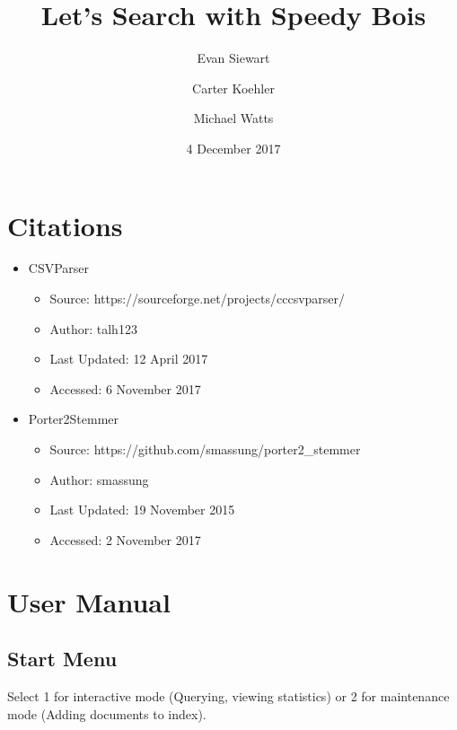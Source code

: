 \documentclass{article}
\title{Let's Search with Speedy Bois}
\date{4 December 2017}
\author{Evan Siewart \and Carter Koehler \and Michael Watts}
\begin{document}
\maketitle


\section{Citations}

\begin{itemize}

\item CSVParser
  \begin{itemize}

  \item Source: https://sourceforge.net/projects/cccsvparser/

  \item Author: talh123

  \item Last Updated: 12 April 2017

  \item Accessed: 6 November 2017
    
  \end{itemize}

\item Porter2Stemmer
  \begin{itemize}

  \item Source: https://github.com/smassung/porter2\_stemmer

  \item Author: smassung

  \item Last Updated: 19 November 2015

  \item Accessed: 2 November 2017
    
  \end{itemize}
  
\end{itemize}

\section{User Manual}

\subsection{Start Menu}

Select 1 for interactive mode (Querying, viewing statistics) or 2 for maintenance mode (Adding documents to index).
\end{document}
